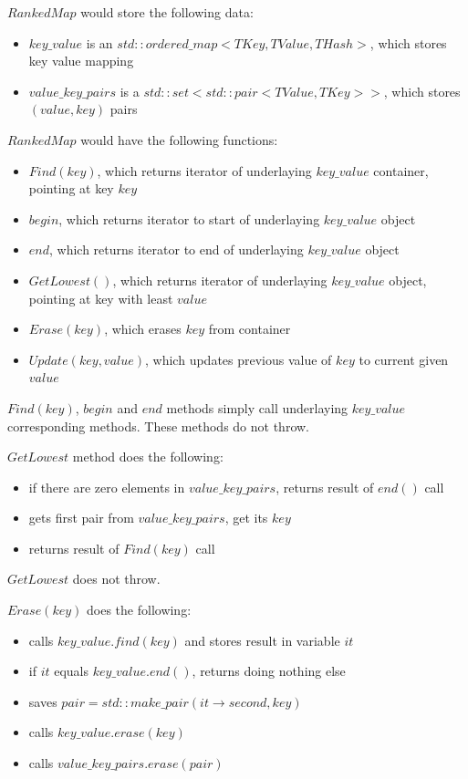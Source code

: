 \documentclass{article}
\begin{document}
$RankedMap$ would store the following data:
\begin{itemize}
	\item $key\_value$ is an $std{::}ordered\_map{<}TKey, TValue, THash{>}$, which stores key value mapping
	\item $value\_key\_pairs$ is a $std{::}set{<}std{::}pair{<}TValue, TKey{>}{>}$, which stores $(value, key)$ pairs
\end{itemize}

$RankedMap$ would have the following functions:
\begin{itemize}
	\item $Find(key)$, which returns iterator of underlaying $key\_value$ container, pointing at key $key$
	\item $begin$, which returns iterator to start of underlaying $key\_value$ object
	\item $end$, which returns iterator to end of underlaying $key\_value$ object
	\item $GetLowest()$, which returns iterator of underlaying $key\_value$ object, pointing at key with least $value$
	\item $Erase(key)$, which erases $key$ from container
	\item $Update(key, value)$, which updates previous value of $key$ to current given $value$
\end{itemize}

$Find(key)$, $begin$ and $end$ methods simply call underlaying $key\_value$ corresponding methods. These methods do not throw.

$GetLowest$ method does the following:
\begin{itemize}
	\item if there are zero elements in $value\_key\_pairs$, returns result of $end()$ call
	\item gets first pair from $value\_key\_pairs$, get its $key$
	\item returns result of $Find(key)$ call
\end{itemize}

$GetLowest$ does not throw.

$Erase(key)$ does the following:
\begin{itemize}
	\item calls $key\_value.find(key)$ and stores result in variable $it$
	\item if $it$ equals $key\_value.end()$, returns doing nothing else
	\item saves $pair = std{::}make\_pair(it\rightarrow second, key)$
	\item calls $key\_value.erase(key)$
	\item calls $value\_key\_pairs.erase(pair)$
\end{itemize}
\end{document}
